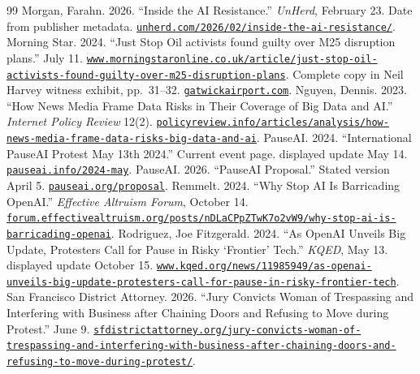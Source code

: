 \documentclass[11pt]{article}
\begin{document}
\begin{thebibliography}{99}
 Morgan, Farahn. 2026. ``Inside the AI Resistance.'' \emph{UnHerd}, February 23. Date from publisher metadata. \href{https://unherd.com/2026/02/inside-the-ai-resistance/}{\nolinkurl{unherd.com/2026/02/inside-the-ai-resistance/}}.
 Morning Star. 2024. ``Just Stop Oil activists found guilty over M25 disruption plans.'' July 11. \href{https://www.morningstaronline.co.uk/article/just-stop-oil-activists-found-guilty-over-m25-disruption-plans}{\nolinkurl{www.morningstaronline.co.uk/article/just-stop-oil-activists-found-guilty-over-m25-disruption-plans}}. Complete copy in Neil Harvey witness exhibit, pp.~31--32. \href{https://www.gatwickairport.com/on/demandware.static/-/Sites-Gatwick-Library/default/dwb3fd22f0/images/Corporate-PDFs/Injunction/2024.07.17-Neil-Harvey-Witness-Exhibit-Bundle-Part-1.pdf}{\nolinkurl{gatwickairport.com}}.
 Nguyen, Dennis. 2023. ``How News Media Frame Data Risks in Their Coverage of Big Data and AI.'' \emph{Internet Policy Review} 12(2). \href{https://policyreview.info/articles/analysis/how-news-media-frame-data-risks-big-data-and-ai}{\nolinkurl{policyreview.info/articles/analysis/how-news-media-frame-data-risks-big-data-and-ai}}.
 PauseAI. 2024. ``International PauseAI Protest May 13th 2024.'' Current event page. displayed update May 14. \href{https://pauseai.info/2024-may}{\nolinkurl{pauseai.info/2024-may}}.
 PauseAI. 2026. ``PauseAI Proposal.'' Stated version April 5. \href{https://pauseai.org/proposal}{\nolinkurl{pauseai.org/proposal}}.
 Remmelt. 2024. ``Why Stop AI Is Barricading OpenAI.'' \emph{Effective Altruism Forum}, October 14. \href{https://forum.effectivealtruism.org/posts/nDLaCPpZTwK7o2vW9/why-stop-ai-is-barricading-openai}{\nolinkurl{forum.effectivealtruism.org/posts/nDLaCPpZTwK7o2vW9/why-stop-ai-is-barricading-openai}}.
 Rodriguez, Joe Fitzgerald. 2024. ``As OpenAI Unveils Big Update, Protesters Call for Pause in Risky `Frontier' Tech.'' \emph{KQED}, May 13. displayed update October 15. \href{https://www.kqed.org/news/11985949/as-openai-unveils-big-update-protesters-call-for-pause-in-risky-frontier-tech}{\nolinkurl{www.kqed.org/news/11985949/as-openai-unveils-big-update-protesters-call-for-pause-in-risky-frontier-tech}}.
 San Francisco District Attorney. 2026. ``Jury Convicts Woman of Trespassing and Interfering with Business after Chaining Doors and Refusing to Move during Protest.'' June 9. \href{https://sfdistrictattorney.org/jury-convicts-woman-of-trespassing-and-interfering-with-business-after-chaining-doors-and-refusing-to-move-during-protest/}{\nolinkurl{sfdistrictattorney.org/jury-convicts-woman-of-trespassing-and-interfering-with-business-after-chaining-doors-and-refusing-to-move-during-protest/}}.

\end{thebibliography}
\end{document}
